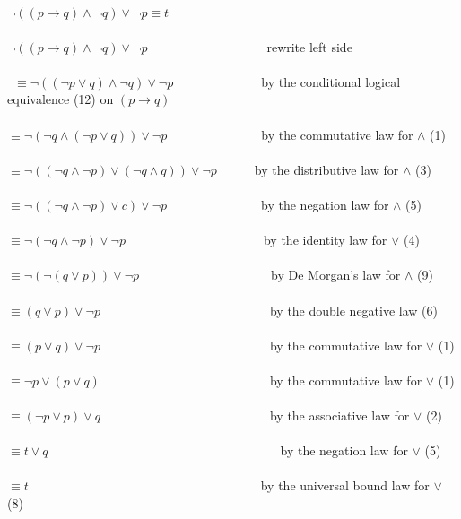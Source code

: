 \documentclass[a4paper,11pt]{article}
\begin{document}
\begin{enumerate}
        $\neg((p \rightarrow q) \wedge \neg q) \vee \neg p \equiv t$\\\\
        $\neg((p \rightarrow q) \wedge \neg q) \vee \neg p$~~~~~~~~~~~~~~~~~~~rewrite left side\\\\\
        $\equiv \neg ((\neg p \vee q) \wedge \neg q) \vee \neg p$~~~~~~~~~~~~~~by the conditional logical equivalence (12) on $(p \rightarrow q)$\\\\
        $\equiv \neg (\neg q \wedge (\neg p \vee q)) \vee \neg p$~~~~~~~~~~~~~~~by the commutative law for $\wedge$ (1)\\\\
        $\equiv \neg ((\neg q \wedge \neg p) \vee (\neg q \wedge q)) \vee \neg p$~~~~~~by the distributive law for $\wedge$ (3)\\\\
        $\equiv \neg ((\neg q \wedge \neg p) \vee c) \vee \neg p$~~~~~~~~~~~~~~~by the negation law for $\wedge$ (5)\\\\
        $\equiv \neg (\neg q \wedge \neg p) \vee \neg p$~~~~~~~~~~~~~~~~~~~~~~by the identity law for $\vee$ (4)\\\\
        $\equiv \neg (\neg (q \vee p)) \vee \neg p$~~~~~~~~~~~~~~~~~~~~~by De Morgan's law for $\wedge$ (9)\\\\
        $\equiv (q \vee p) \vee \neg p$~~~~~~~~~~~~~~~~~~~~~~~~~~~by the double negative law (6)\\\\
        $\equiv (p \vee q) \vee \neg p$~~~~~~~~~~~~~~~~~~~~~~~~~~~by the commutative law for $\vee$ (1)\\\\
        $\equiv \neg p \vee (p \vee q)$~~~~~~~~~~~~~~~~~~~~~~~~~~~by the commutative law for $\vee$ (1)\\\\
        $\equiv (\neg p \vee p) \vee q$~~~~~~~~~~~~~~~~~~~~~~~~~~~by the associative law for $\vee$ (2)\\\\
        $\equiv t \vee q$~~~~~~~~~~~~~~~~~~~~~~~~~~~~~~~~~~~~~by the negation law for $\vee$ (5)\\\\
        $\equiv t$~~~~~~~~~~~~~~~~~~~~~~~~~~~~~~~~~~~~~by the universal bound law for $\vee$ (8)
\end{enumerate}
\end{document}
